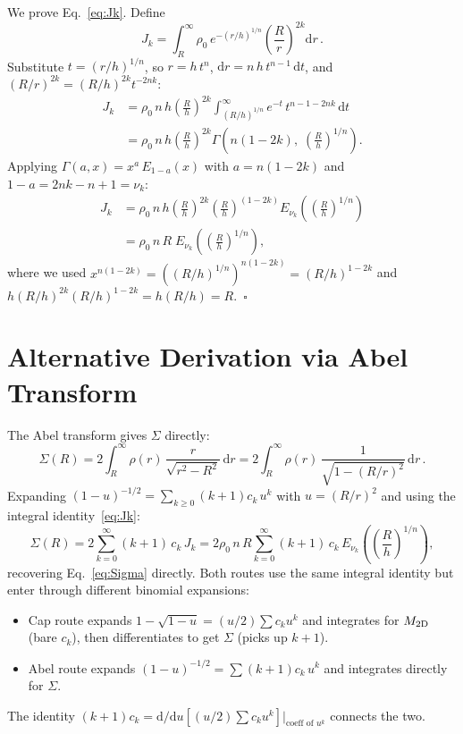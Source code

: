 \documentclass{article}
\begin{document}
We prove Eq.~\eqref{eq:Jk}.  Define
\begin{equation}
J_k = \int_R^{\infty}\rho_0\,e^{-(r/h)^{1/n}}\left(\frac{R}{r}\right)^{\!2k}\mathrm{d}r\,.
\end{equation}
Substitute $t=(r/h)^{1/n}$, so $r=h\,t^n$,
$\mathrm{d}r = n\,h\,t^{n-1}\,\mathrm{d}t$, and $(R/r)^{2k}=(R/h)^{2k}t^{-2nk}$:
\begin{align}
J_k &= \rho_0\,n\,h\left(\frac{R}{h}\right)^{\!2k}
\int_{(R/h)^{1/n}}^{\infty} e^{-t}\,t^{n-1-2nk}\,\mathrm{d}t \nonumber\\
&= \rho_0\,n\,h\left(\frac{R}{h}\right)^{\!2k}
\Gamma\!\left(n(1-2k),\;\left(\frac{R}{h}\right)^{\!1/n}\right).
\end{align}
Applying $\Gamma(a,x)=x^a\,E_{1-a}(x)$ with $a=n(1-2k)$ and $1-a=2nk-n+1=\nu_k$:
\begin{align}
J_k &= \rho_0\,n\,h\left(\frac{R}{h}\right)^{\!2k}
\left(\frac{R}{h}\right)^{\!(1-2k)}
E_{\nu_k}\!\left(\left(\frac{R}{h}\right)^{\!1/n}\right) \nonumber\\
&= \rho_0\,n\,R\;E_{\nu_k}\!\left(\left(\frac{R}{h}\right)^{\!1/n}\right),
\end{align}
where we used $x^{n(1-2k)}=((R/h)^{1/n})^{n(1-2k)}=(R/h)^{1-2k}$ and
$h(R/h)^{2k}(R/h)^{1-2k}=h(R/h)=R$.~$\square$

\section{Alternative Derivation via Abel Transform}
\label{app:abel}

The Abel transform gives $\Sigma$ directly:
\begin{equation}
\Sigma(R) = 2\int_R^{\infty}\rho(r)\,\frac{r}{\sqrt{r^2-R^2}}\,\mathrm{d}r
= 2\int_R^{\infty}\rho(r)\,\frac{1}{\sqrt{1-(R/r)^2}}\,\mathrm{d}r\,.
\end{equation}
Expanding $(1-u)^{-1/2}=\sum_{k\ge0}(k+1)c_k\,u^k$ with $u=(R/r)^2$ and
using the integral identity~\eqref{eq:Jk}:
\begin{equation}
\Sigma(R) = 2\sum_{k=0}^{\infty}(k+1)\,c_k\,J_k
= 2\rho_0\,n\,R\sum_{k=0}^{\infty}(k+1)\,c_k\,
E_{\nu_k}\!\left(\left(\frac{R}{h}\right)^{\!1/n}\right),
\end{equation}
recovering Eq.~\eqref{eq:Sigma} directly.  Both routes use the same integral
identity but enter through different binomial expansions:
\begin{itemize}
\item Cap route expands $1-\sqrt{1-u}=(u/2)\sum c_k u^k$ and integrates for
$M_{\rm 2D}$ (bare $c_k$), then differentiates to get $\Sigma$ (picks up
$k+1$).
\item Abel route expands $(1-u)^{-1/2}=\sum(k+1)c_k\,u^k$ and integrates
directly for $\Sigma$.
\end{itemize}
The identity $(k+1)c_k = \mathrm{d}/\mathrm{d}u[(u/2)\sum c_k u^k]|_{\text{coeff of }u^k}$ connects the two.
\end{document}
